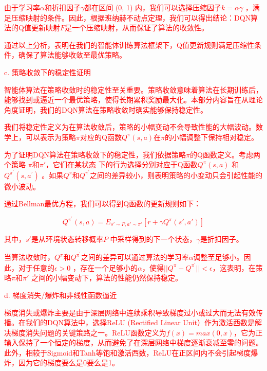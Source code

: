 \documentclass[preprint,12pt]{elsarticle}
\begin{document}
\textcolor{red}{由于学习率\(\alpha\)和折扣因子\(\gamma\)都在区间 (0, 1) 内，我们可以选择压缩因子\(k=\alpha \gamma\)
，满足压缩映射的条件。因此，根据班纳赫不动点定理，我们可以得出结论：DQN算法的Q值更新映射\(F\)是一个压缩映射，从而保证了算法的收敛性。}

\textcolor{red}{通过以上分析，表明在我们的智能体训练算法框架下，Q值更新规则满足压缩性条件，确保了算法能够收敛至最优策略。}

\textcolor{red}{c.	策略收敛下的稳定性证明}

\textcolor{red}{智能体算法在策略收敛时的稳定性至关重要。策略收敛意味着算法在长期训练后，能够找到或逼近一个最优策略，使得长期累积奖励最大化。本部分内容旨在从理论角度证明，我们的DQN算法在策略收敛时确实能够保持稳定性。}

\textcolor{red}{我们将稳定性定义为在算法收敛后，策略的小幅变动不会导致性能的大幅波动。数学上，可以表示为策略\(\pi\)对应的Q函数\(Q^\pi(s,a)\)在\(\pi\)的小幅调整下保持相对稳定。}

\textcolor{red}{为了证明DQN算法在策略收敛下的稳定性，我们依据策略\(\pi\)的Q函数定义。考虑两个策略 \(\pi\)和\(\pi'\)，它们在某状态 下的行为选择分别对应于Q函数\(Q^\pi(s,a)\) 和\(Q^{\pi^{'}} {(s,a^{'})}\) 。如果\(Q^{\pi}\)和\(Q^{\pi^{'}}\)之间的差异较小，则表明策略的小变动只会引起性能的微小波动。}

\textcolor{red}{通过Bellman最优方程，我们可以得到Q函数的更新规则如下：}

\textcolor{red}{
\begin{equation}
    Q^{\pi^{'}}(s,a)=E_{s'\sim P,a'\sim \pi'}[r+\gamma Q^\pi (s',a')]
\end{equation}
}

\textcolor{red}{其中，\(s'\)是从环境状态转移概率\(P\) 中采样得到的下一个状态，\(\gamma\)是折扣因子。}

\textcolor{red}{当算法收敛时，\(Q^\pi\)和\(Q^{\pi^{'}}\)之间的差异可以通过算法的学习率\(\alpha\)调整至足够小。因此，对于任意的\(\epsilon>0\) ，存在一个足够小的\(\alpha\)，使得\(||Q^\pi-Q^{\pi^{'}}||<\epsilon\)，这表明，在策略\(\pi\)和\(\pi'\) 之间的小幅变动下，算法的性能仍然保持稳定。}

\textcolor{red}{d.	梯度消失/爆炸和非线性函数逼近}

\textcolor{red}{梯度消失或爆炸主要是由于深层网络中连续乘积导致梯度过小或过大而无法有效传播。在我们的DQN算法中，选择ReLU (Rectified Linear Unit）作为激活西数是解决梯度消失问题的关键策路之一。ReLU函数定义为\(f(x)=max⁡(0,x)\)，它为正输入保持了一个恒定的梯度，从而避免了在深层网络中梯度逐渐衰减至零的问题。此外，相较于Sigmoid和Tanh等饱和激活西数，ReLU在正区间内不会引起梯度爆炸，因为它的梯度要么是0要么是1。}
\end{document}
